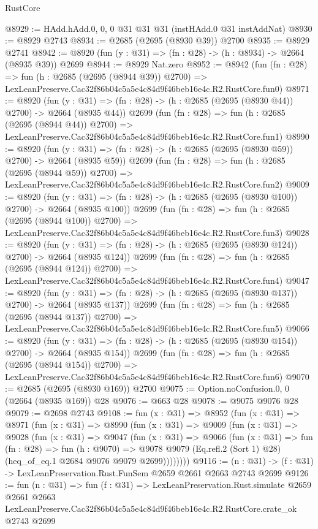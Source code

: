 \begin{lexlean}{RustCore}
\begin{coremodule}
@8929 := HAdd.hAdd.{0, 0, 0} @31 @31 @31 (instHAdd.{0} @31 instAddNat)
@8930 := @8929 @2743
@8934 := @2685 (@2695 (@8930 @39)) @2700
@8935 := @8929 @2741
@8942 := @8920 (fun (y : @31) => (fn : @28) -> (h : @8934) -> @2664 (@8935 @39)) @2699
@8944 := @8929 Nat.zero
@8952 := @8942
    (fun (fn : @28) =>
    fun (h : @2685 (@2695 (@8944 @39)) @2700) =>
    LexLeanPreserve.Cac32f86b04c5a5e4c84d9f46beb16e4c.R2.RustCore.fun0)
@8971 := @8920
    (fun (y : @31) => (fn : @28) -> (h : @2685 (@2695 (@8930 @44)) @2700) -> @2664 (@8935 @44))
    @2699
    (fun (fn : @28) =>
    fun (h : @2685 (@2695 (@8944 @44)) @2700) =>
    LexLeanPreserve.Cac32f86b04c5a5e4c84d9f46beb16e4c.R2.RustCore.fun1)
@8990 := @8920
    (fun (y : @31) => (fn : @28) -> (h : @2685 (@2695 (@8930 @59)) @2700) -> @2664 (@8935 @59))
    @2699
    (fun (fn : @28) =>
    fun (h : @2685 (@2695 (@8944 @59)) @2700) =>
    LexLeanPreserve.Cac32f86b04c5a5e4c84d9f46beb16e4c.R2.RustCore.fun2)
@9009 := @8920
    (fun (y : @31) => (fn : @28) -> (h : @2685 (@2695 (@8930 @100)) @2700) -> @2664 (@8935 @100))
    @2699
    (fun (fn : @28) =>
    fun (h : @2685 (@2695 (@8944 @100)) @2700) =>
    LexLeanPreserve.Cac32f86b04c5a5e4c84d9f46beb16e4c.R2.RustCore.fun3)
@9028 := @8920
    (fun (y : @31) => (fn : @28) -> (h : @2685 (@2695 (@8930 @124)) @2700) -> @2664 (@8935 @124))
    @2699
    (fun (fn : @28) =>
    fun (h : @2685 (@2695 (@8944 @124)) @2700) =>
    LexLeanPreserve.Cac32f86b04c5a5e4c84d9f46beb16e4c.R2.RustCore.fun4)
@9047 := @8920
    (fun (y : @31) => (fn : @28) -> (h : @2685 (@2695 (@8930 @137)) @2700) -> @2664 (@8935 @137))
    @2699
    (fun (fn : @28) =>
    fun (h : @2685 (@2695 (@8944 @137)) @2700) =>
    LexLeanPreserve.Cac32f86b04c5a5e4c84d9f46beb16e4c.R2.RustCore.fun5)
@9066 := @8920
    (fun (y : @31) => (fn : @28) -> (h : @2685 (@2695 (@8930 @154)) @2700) -> @2664 (@8935 @154))
    @2699
    (fun (fn : @28) =>
    fun (h : @2685 (@2695 (@8944 @154)) @2700) =>
    LexLeanPreserve.Cac32f86b04c5a5e4c84d9f46beb16e4c.R2.RustCore.fun6)
@9070 := @2685 (@2695 (@8930 @169)) @2700
@9075 := Option.noConfusion.{0, 0} (@2664 (@8935 @169)) @28
@9076 := @663 @28
@9078 := @9075 @9076 @28
@9079 := @2698 @2743
@9108 := fun (x : @31) =>
  @8952
    (fun (x : @31) =>
    @8971
      (fun (x : @31) =>
      @8990
        (fun (x : @31) =>
        @9009
          (fun (x : @31) =>
          @9028
            (fun (x : @31) =>
            @9047
              (fun (x : @31) =>
              @9066
                (fun (x : @31) =>
                fun (fn : @28) =>
                fun (h : @9070) =>
                @9078
                  @9079
                  (Eq.refl.{2} (Sort 1) @28)
                  (heq_of_eq.{1} @2684 @9076 @9079 @2699))))))))
@9116 := (n : @31) -> (f : @31) -> LexLeanPreservation.Rust.FunSem @2659 @2661 @2663 @2743 @2699
@9126 := fun (n : @31) =>
  fun (f : @31) =>
  LexLeanPreservation.Rust.simulate
    @2659
    @2661
    @2663
    LexLeanPreserve.Cac32f86b04c5a5e4c84d9f46beb16e4c.R2.RustCore.crate_ok
    @2743
    @2699
\end{coremodule}
\end{lexlean}
